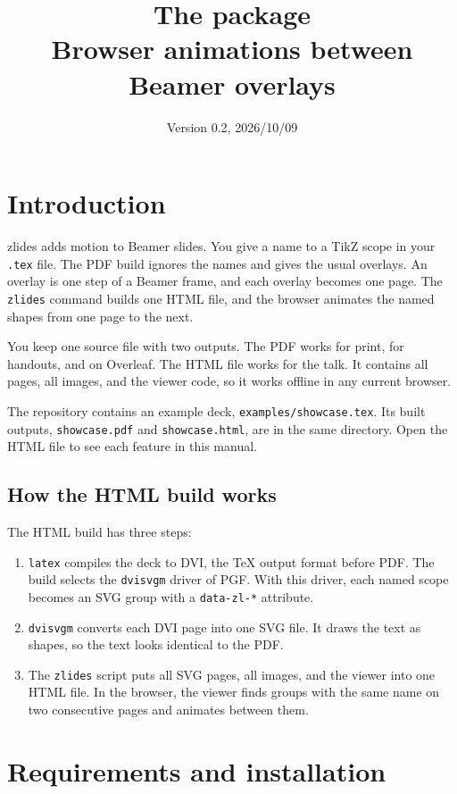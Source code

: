 \documentclass[11pt]{article}
\title{The \pkg{} package\\[0.3em]\large Browser animations between Beamer overlays}
\date{Version 0.2, 2026/10/09}
\newcommand{\pkg}{\textsf{zlides}}
\newcommand{\cmd}[1]{\texttt{#1}}
\begin{document}
\maketitle
\tableofcontents

\section{Introduction}

\pkg{} adds motion to Beamer slides. You give a name to a TikZ scope in your
\cmd{.tex} file. The PDF build ignores the names and gives the usual overlays.
An overlay is one step of a Beamer frame, and each overlay becomes one page. The
\cmd{zlides} command builds one HTML file, and the browser animates the named
shapes from one page to the next.

You keep one source file with two outputs. The PDF works for print, for handouts,
and on Overleaf. The HTML file works for the talk. It contains all pages, all
images, and the viewer code, so it works offline in any current browser.

The repository contains an example deck, \cmd{examples/showcase.tex}. Its built
outputs, \cmd{showcase.pdf} and \cmd{showcase.html}, are in the same directory.
Open the HTML file to see each feature in this manual.

\subsection{How the HTML build works}

The HTML build has three steps:
\begin{enumerate}
	\item \cmd{latex} compiles the deck to DVI, the TeX output format before PDF.
	      The build selects the \cmd{dvisvgm} driver of PGF. With this driver, each
	      named scope becomes an SVG group with a \cmd{data-zl-*} attribute.
	\item \cmd{dvisvgm} converts each DVI page into one SVG file. It draws the text
	      as shapes, so the text looks identical to the PDF.
	\item The \cmd{zlides} script puts all SVG pages, all images, and the viewer
	      into one HTML file. In the browser, the viewer finds groups with the same name
	      on two consecutive pages and animates between them.
\end{enumerate}

\section{Requirements and installation}
\end{document}
